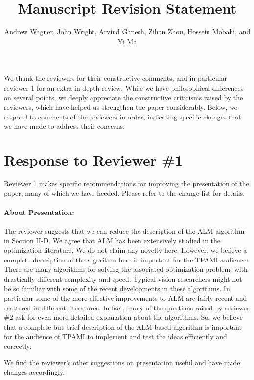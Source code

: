 \documentclass[11pt]{article}
\begin{document}
   

   \title{\Large {\bf Manuscript  Revision Statement}}

       \author{{Andrew Wagner, John Wright, Arvind Ganesh, Zihan Zhou, Hossein Mobahi, and Yi Ma}}

   \date{}
   \maketitle

We thank the reviewers for their constructive comments, and in particular
reviewer 1 for an extra in-depth review.  While we have philosophical
differences on several points, we deeply appreciate the constructive
criticisms raised by the reviewers, which have helped us strengthen the paper considerably.
Below, we respond to comments of the reviewers in order, indicating
specific changes that we have made to address their concerns.


\section{Response to Reviewer \#1}
Reviewer 1 makes specific recommendations for improving the
presentation of the paper, many of which we have heeded.  Please refer to the change
list for details.

\paragraph{About Presentation:} The reviewer suggests that we can reduce the description
of the ALM algorithm in Section II-D. We agree that ALM has been extensively studied in the optimization
literature. We do not claim any novelty here. However, we believe a complete description of the algorithm
here is important for the TPAMI audience: There are
many algorithms for solving the associated optimization problem, with drastically different complexity
and speed. Typical vision researchers might not be so familiar with some of the recent
developments in these algorithms. In particular some of the more effective improvements to ALM are fairly
recent and scattered in different literatures. In fact, many of the questions raised by reviewer \#2
ask for even more detailed explanation about the algorithms. So, we believe that a complete but brief
description of the ALM-based algorithm is important for the audience of TPAMI to implement and
test the ideas efficiently and correctly.

We find the reviewer's other suggestions on presentation useful and have made changes accordingly.
\end{document}
